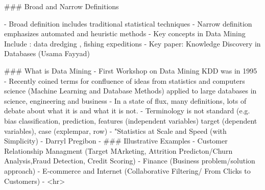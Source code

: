 
### Broad and Narrow Definitions
 
- Broad definition includes traditional statistical techniques
- Narrow definition emphasizes automated and heuristic methods
- Key concepts in Data Mining Include : data dredging , fishing expeditions
- Key paper: Knowledge Discovery in Databases (Usama Fayyad)

### What is Data Mining
- First Workshop on Data Mining KDD was in 1995
- Recently coined terms for confluence of ideas from statistics and computers science (Machine Learning and Database Methods) applied to 
large databases in science, engineering and business
- In a state of flux, many definitions, lots of debate about what it is and what it is not.
- Terminology is not standard (e.g. bias classification, prediction, features (independent variables)
target (dependent variables), case (explempar, row)
- "Statistics at Scale and Speed (with Simplicity) - Darryl Pregibon
- 
### Illustrative Examples
- Customer Relationship Managment (Target MArketing, Attrition Predicton/Churn Analysis,Fraud Detection, Credit Scoring)
- Finance  (Business problem/solution approach)
- E-commerce and Internet (Collaborative Filtering/ From Clicks to Customers)
- 
<hr>

